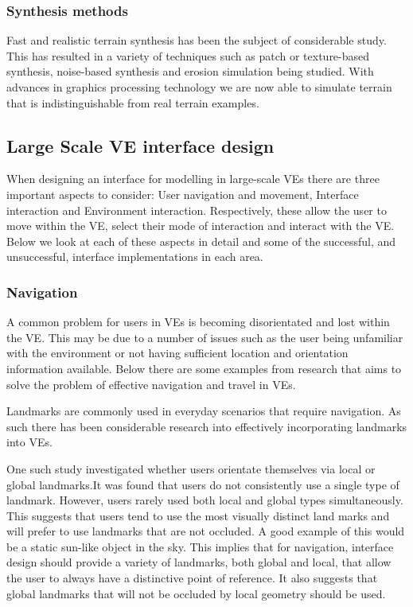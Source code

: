 \documentclass{sig-alternate-05-2015}
\begin{document}
\subsubsection{Synthesis methods}
 Fast and realistic terrain synthesis has been the subject of considerable study. This has resulted in a variety of techniques such as patch or texture-based synthesis\cite{Cruz2015, Tasse2012}, noise-based synthesis\cite{Musgrave1989} and erosion simulation\cite{Anh2007} being studied. With advances in graphics processing technology we are now able to simulate terrain that is indistinguishable from real terrain examples\cite{Gain2015}. 

\subsection{Large Scale VE interface design}
When designing an interface for modelling in large-scale VEs there are three important aspects to consider: User navigation and movement, Interface interaction and Environment interaction\cite{Bowman2001}. Respectively, these allow the user to move within the VE, select their mode of interaction and interact with the VE. Below we look at each of these aspects in detail and some of the successful, and unsuccessful, interface implementations in each area.
\subsubsection{Navigation}
A common problem for users in VEs is becoming disorientated and lost within the VE\cite{Darken1993}. This may be due to a number of issues such as the user being unfamiliar with the environment or not having sufficient location and orientation information available. Below there are some examples from research that aims to solve the problem of effective navigation and travel in VEs.

Landmarks are commonly used in everyday scenarios that require navigation. As such there has been considerable research into effectively incorporating landmarks into VEs.

One such study investigated whether users orientate themselves via local or global landmarks\cite{Steck2000}.It was found that users do not consistently use a single type of landmark. However, users rarely used both local and global types simultaneously. This suggests that users tend to use the most visually distinct land marks and will prefer to use landmarks that are not occluded. A good example of this would be a static sun-like object in the sky. This implies that for navigation, interface design should provide a variety of landmarks, both global and local, that allow the user to always have a distinctive point of reference. It also suggests that global landmarks that will not be occluded by local geometry should be used. 
\end{document}
